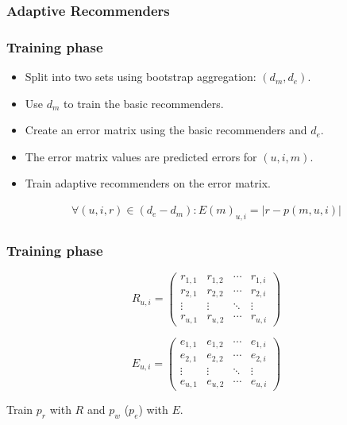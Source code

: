 \documentclass[screen]{beamer}
\begin{document}
\begin{frame}
  \frametitle{Adaptive Recommenders}
  
\end{frame}

\begin{frame}
  \frametitle{Training phase}
  
  \begin{itemize}
    \item Split into two sets using bootstrap aggregation: $(d_m,d_e)$.
    \item Use $d_m$ to train the basic recommenders.
    \item Create an error matrix using the basic recommenders and $d_e$. 
    \item The error matrix values are predicted errors for $(u,i,m)$.
    \item Train adaptive recommenders on the error matrix.
  \end{itemize}
  
  \begin{eqnarray}
    \forall (u,i,r) \in (d_e - d_m): E(m)_{u,i} = |r - p(m,u,i)|
  \end{eqnarray}
\end{frame}

\begin{frame}
  \frametitle{Training phase}
  
  \begin{equation*}
     R_{u,i} =
     \begin{pmatrix}
      r_{1,1} & r_{1,2} & \cdots & r_{1,i} \\
      r_{2,1} & r_{2,2} & \cdots & r_{2,i} \\
      \vdots  & \vdots  & \ddots & \vdots  \\
      r_{u,1} & r_{u,2} & \cdots & r_{u,i}
     \end{pmatrix}
    \end{equation*}

  \vspace{1em}
  
    \begin{equation*}
     E_{u,i} =
     \begin{pmatrix}
        e_{1,1} & e_{1,2} & \cdots & e_{1,i} \\
        e_{2,1} & e_{2,2} & \cdots & e_{2,i} \\
        \vdots  & \vdots  & \ddots & \vdots  \\
        e_{u,1} & e_{u,2} & \cdots & e_{u,i}
     \end{pmatrix}
    \end{equation*}
    
    \vspace{1em}
    \begin{center}
      Train $p_r$ with $R$ and $p_w$ ($p_e$) with $E$.
    \end{center}
\end{frame}
\end{document}
